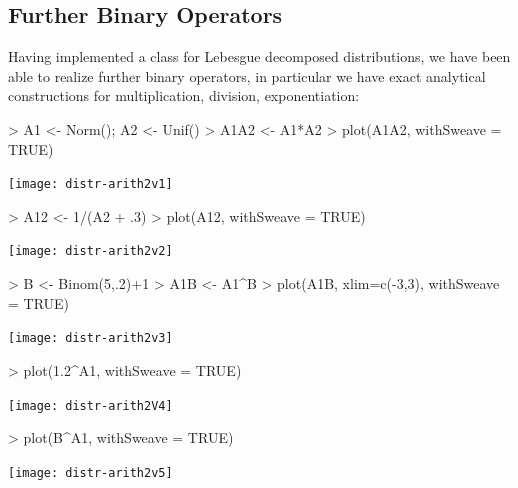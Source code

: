 \documentclass[11pt]{article}
\begin{document}
\subsection{Further Binary Operators}
%
Having implemented a class for Lebesgue decomposed distributions, we have been
able to realize further binary operators, in particular we have exact
analytical constructions for multiplication, division, exponentiation:
\begin{Schunk}
\begin{Sinput}
>   A1 <- Norm(); A2 <- Unif()
>   A1A2 <- A1*A2
>   plot(A1A2, withSweave = TRUE)
\end{Sinput}
\end{Schunk}
\texttt{[image: distr-arith2v1]}
\begin{Schunk}
\begin{Sinput}
>   A12 <- 1/(A2 + .3)
>   plot(A12, withSweave = TRUE) 
\end{Sinput}
\end{Schunk}
\texttt{[image: distr-arith2v2]}
\begin{Schunk}
\begin{Sinput}
>   B <- Binom(5,.2)+1
>   A1B <- A1^B
>   plot(A1B, xlim=c(-3,3), withSweave = TRUE)
\end{Sinput}
\end{Schunk}
\texttt{[image: distr-arith2v3]}
\begin{Schunk}
\begin{Sinput}
>   plot(1.2^A1, withSweave = TRUE)
\end{Sinput}
\end{Schunk}
\texttt{[image: distr-arith2V4]}
\begin{Schunk}
\begin{Sinput}
>   plot(B^A1, withSweave = TRUE)
\end{Sinput}
\end{Schunk}
\texttt{[image: distr-arith2v5]}
%
\end{document}
